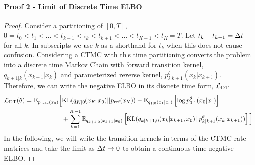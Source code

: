 \documentclass{article}
\begin{document}
\paragraph{Proof 2 - Limit of Discrete Time ELBO}
\begin{proof}

Consider a partitioning of $[0, T]$, $0 = t_0 < t_1 < \dots < t_{k-1} < t_k < t_{k+1} < \dots < t_{K-1} < t_K = T$. Let $t_k - t_{k-1} = \Delta t$ for all $k$. In subscripts we use $k$ as a shorthand for $t_k$ when this does not cause confusion. Considering a CTMC with this time partitioning converts the problem into a discrete time Markov Chain with forward transition kernel, $q_{k+1|k}(x_{k+1}|x_k)$ and parameterized reverse kernel, $p^\theta_{k|k+1}(x_k | x_{k+1})$. Therefore, we can write the negative ELBO in its discrete time form, $\mathcal{L}_{\textup{DT}}$
\begin{align}
    \textstyle \mathcal{L}_{\textup{DT}}(\theta) = \mathbb{E}_{p_{\textup{data}}(x_0)} \Big[& \text{KL}( q_{K|0}(x_K | x_0) || p_{\textrm{ref}}(x_K) ) - \mathbb{E}_{q_{1|0}(x_1 | x_0)} \left[ \log p^\theta_{0|1}(x_0 | x_1)\right] \\
    & + \sum_{k=1}^{K-1} \mathbb{E}_{q_{k+1|0}(x_{k+1} | x_0)} \left[ \text{KL}(q_{k|k+1,0}(x_{k}|x_{k+1}, x_0) || p_{k|k+1}^{\theta}(x_{k}|x_{k+1})) \right] \Big]
\end{align}
In the following, we will write the transition kernels in terms of the CTMC rate matrices and take the limit as $\Delta t \rightarrow 0$ to obtain a continuous time negative ELBO.


\end{proof}
\end{document}
